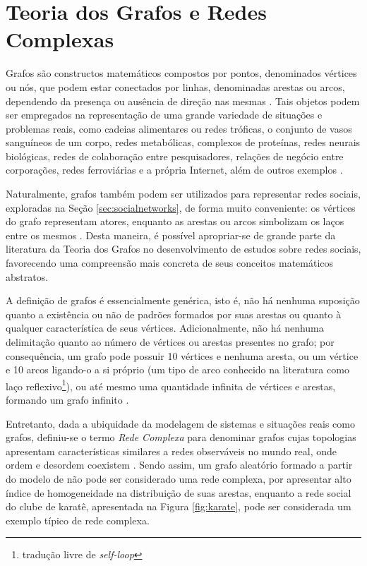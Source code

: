 \section{Teoria dos Grafos e Redes Complexas} \label{sec:graphtheory}

Grafos são constructos matemáticos compostos por pontos, denominados vértices ou nós, que podem estar conectados por linhas, denominadas arestas ou arcos, dependendo da presença ou ausência de direção nas mesmas \cite{Bondy1976}. Tais objetos podem ser empregados na representação de uma grande variedade de situações e problemas reais, como cadeias alimentares ou redes tróficas, o conjunto de vasos sanguíneos de um corpo, redes metabólicas, complexos de proteínas, redes neurais biológicas, redes de colaboração entre pesquisadores, relações de negócio entre corporações, redes ferroviárias e a própria Internet, além de outros exemplos \cite{Newman2003}.

Naturalmente, grafos também podem ser utilizados para representar redes sociais, exploradas na Seção \ref{sec:socialnetworks}, de forma muito conveniente: os vértices do grafo representam atores, enquanto as arestas ou arcos simbolizam os laços entre os mesmos \cite{Newman2003}. Desta maneira, é possível apropriar-se de grande parte da literatura da Teoria dos Grafos no desenvolvimento de estudos sobre redes sociais, favorecendo uma compreensão mais concreta de seus conceitos matemáticos abstratos.

A definição de grafos é essencialmente genérica, isto é, não há nenhuma suposição quanto a existência ou não de padrões formados por suas arestas ou quanto à qualquer característica de seus vértices. Adicionalmente, não há nenhuma delimitação quanto ao número de vértices ou arestas presentes no grafo; por consequência, um grafo pode possuir 10 vértices e nenhuma aresta, ou um vértice e 10 arcos ligando-o a si próprio (um tipo de arco conhecido na literatura como laço reflexivo\footnote{tradução livre de \textit{self-loop}}), ou até mesmo uma quantidade infinita de vértices e arestas, formando um grafo infinito \cite{Bondy1976}.

Entretanto, dada a ubiquidade da modelagem de sistemas e situações reais como grafos, definiu-se o termo \emph{Rede Complexa} para denominar grafos cujas topologias apresentam características similares a redes observáveis no mundo real, onde ordem e desordem coexistem \cite{Fortunato2010}. Sendo assim, um grafo aleatório formado a partir do modelo de  não pode ser considerado uma rede complexa, por apresentar alto índice de homogeneidade na distribuição de suas arestas, enquanto a rede social do clube de karatê, apresentada na Figura \ref{fig:karate}, pode ser considerada um exemplo típico de rede complexa.

